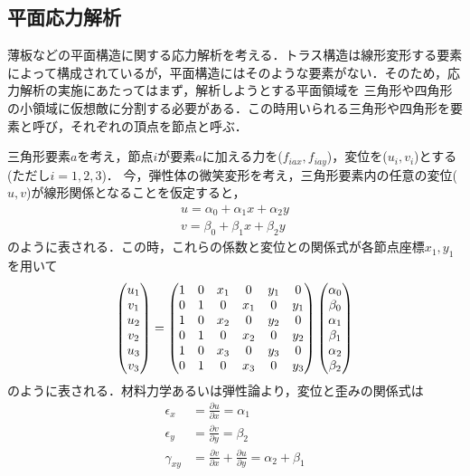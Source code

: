 \documentclass[a4paper,11pt,uplatex]{jsarticle}
\begin{document}
\subsection{平面応力解析}
薄板などの平面構造に関する応力解析を考える．トラス構造は線形変形する要素によって構成されているが，平面構造にはそのような要素がない．そのため，応力解析の実施にあたってはまず，解析しようとする平面領域を
三角形や四角形の小領域に仮想敵に分割する必要がある．この時用いられる三角形や四角形を要素と呼び，それぞれの頂点を節点と呼ぶ．
\par
三角形要素$a$を考え，節点$i$が要素$a$に加える力を($f_{iax},f_{iay}$)，変位を($u_i,v_i$)とする(ただし$i = 1,2,3$)．
今，弾性体の微笑変形を考え，三角形要素内の任意の変位($u,v$)が線形関係となることを仮定すると，
\begin{align}
  u = \alpha_0 + \alpha_1 x + \alpha_2 y \\
  v = \beta_0 +\beta_1 x + \beta_2 y
\end{align}
のように表される．この時，これらの係数と変位との関係式が各節点座標$x_1,y_1$を用いて
\begin{align}
  \label{17}
  \begin{pmatrix} u_1 \\ v_1 \\ u_2 \\ v_2 \\ u_3 \\ v_3 \end{pmatrix} = \begin{pmatrix} 1 & 0 & x_1 & 0 & y_1 & 0 \\ 0 & 1 & 0 & x_1 & 0 & y_1 \\
  1 & 0 & x_2 & 0 & y_2 & 0 \\ 0 & 1 & 0 & x_2 & 0 & y_2 \\ 1 & 0 & x_3 & 0 & y_3 & 0 \\ 0 & 1 & 0 & x_3 & 0 & y_3 \end{pmatrix}
  \begin{pmatrix} \alpha_0 \\ \beta_0 \\ \alpha_1 \\ \beta_1 \\ \alpha_2 \\ \beta_2 \end{pmatrix}
\end{align}
のように表される．材料力学あるいは弾性論より，変位と歪みの関係式は
\begin{align}
  \epsilon_x &= \frac{\partial{u}}{\partial{x}} = \alpha_1 \\
  \epsilon_y &= \frac{\partial{v}}{\partial{y}} = \beta_2 \\
  \gamma_{xy} &= \frac{\partial{v}}{\partial{x}} + \frac{\partial{u}}{\partial{y}} = \alpha_2 + \beta_1
\end{align}
\end{document}
